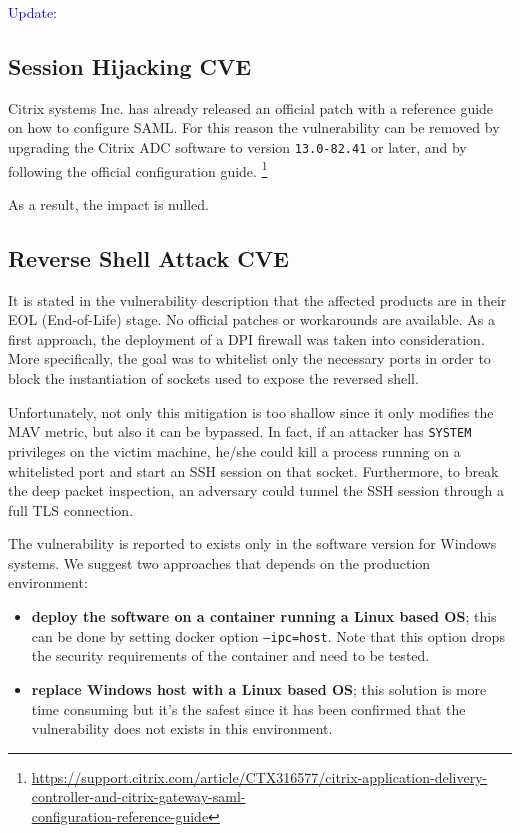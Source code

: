 \noindent \textcolor{blue}{Update:}

\subsection*{Session Hijacking \- CVE}

Citrix systems Inc. has already released an official patch with a reference guide on how to configure SAML. For this reason the vulnerability can be removed by upgrading the Citrix ADC software to version \texttt{13.0-82.41} or later, and by following the official configuration guide. \footnote{\href{https://support.citrix.com/article/CTX316577/citrix-application-delivery-controller-and-citrix-gateway-saml-configuration-reference-guide} {https://support.citrix.com/article/CTX316577/citrix-application-delivery-controller-and-citrix-gateway-saml-\\configuration-reference-guide}}

As a result, the impact is nulled.

\subsection*{Reverse Shell Attack \- CVE}

It is stated in the vulnerability description that the affected products are in their EOL (End-of-Life) stage. No official patches or workarounds are available. As a first approach, the deployment of a DPI firewall was taken into consideration. More specifically, the goal was to whitelist only the necessary ports in order to block the instantiation of sockets used to expose the reversed shell. 

Unfortunately, not only this mitigation is too shallow since it only modifies the MAV metric, but also it can be bypassed. In fact, if an attacker has \texttt{SYSTEM} privileges on the victim machine, he/she could kill a process running on a whitelisted port and start an SSH session on that socket. Furthermore, to break the deep packet inspection, an adversary could tunnel the SSH session through a full TLS connection.\cite{online:SSH-TLS}

The vulnerability is reported to exists only in the software version for Windows systems. We suggest two approaches that depends on the production environment:

\begin{itemize}
    \item \textbf{deploy the software on a container running a Linux based OS}; this can be done by setting docker option \texttt{--ipc=host}. Note that this option drops the security requirements of the container and need to be tested.
    \item \textbf{replace Windows host with a Linux based OS}; this solution is more time consuming but it's the safest since it has been confirmed that the vulnerability does not exists in this environment.
\end{itemize}

